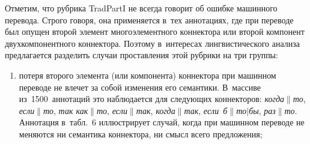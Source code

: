 \begin{multicols}{2}
  Отметим, что рубрика TradPartI не всегда говорит об ошибке машинного 
перевода. Строго говоря, она применяется в~тех аннотациях, где при переводе 
был опущен второй элемент многоэлементного коннектора или второй 
компонент двухкомпонентного коннектора. Поэтому в~интересах 
лингвистического анализа предлагается разделить случаи проставления этой 
рубрики на три группы:\\[-15pt]
  \begin{enumerate}[(1)]
\item потеря второго элемента (или компонента) коннектора при машинном 
переводе не влечет за собой изменения его семантики. В~массиве 
из~1500~аннотаций это наблюдается для следующих коннекторов: 
\textit{когда}$\|$\textit{то}, \textit{если}$\|$\textit{то}, \textit{так 
как}$\|$\textit{то}, \textit{если}$\|$\textit{так}, \textit{когда}$\|$\textit{так}, 
\textit{если~б}$\|$\textit{то}$\vert$\textit{бы}, \textit{раз}$\|$\textit{то}. 
Аннотация в~табл.~6 иллюстрирует случай, когда при машинном переводе не 
меняются ни семантика коннектора, ни смысл всего предложения;


\begin{table*}\small %
  \begin{center}
  \vspace*{2ex}
  

\end{center}
\end{table*}
\end{enumerate}
\end{multicols}
